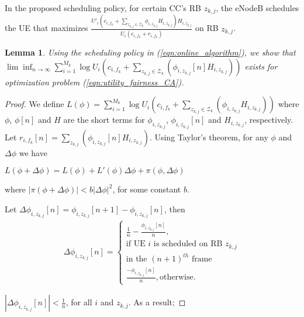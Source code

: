\documentclass[conference]{IEEEtran}
\newtheorem{lem}[thm]{Lemma}
\begin{document}
In the proposed scheduling policy, for certain CC's RB $z_{k,j}$, the eNodeB schedules the UE that maximizes $\frac{U'_i(c_{i,f_k}+\sum_{z_{k,j}\in \mathcal{Z}_k}\phi_{i,z_{k,j}}H_{i,z_{k,j}})H_{i,z_{k,j}}}{U_i(c_{i,f_k}+r_{i,f_k})}$ on RB $z_{k,j}$.

\begin{lem}\label{lem:optimality}  Using the scheduling policy in (\ref{eqn:online_algorithm}), we show that $\lim \inf_{n \rightarrow \infty} \sum_{i=1}^{M_k} \log U_i(c_{i,f_k}+\sum_{z_{k,j}\in \mathcal{Z}_k}(\phi_{i,z_{k,j}}[n] H_{i,z_{k,j}}))$ exists for optimization problem (\ref{eqn:utility_fairness_CA}).
\end{lem}

\begin{proof}
We define $L(\phi)=\sum_{i=1}^{M_k}\log U_i(c_{i,f_k}+\sum_{z_{k,j}\in \mathcal{Z}_k}(\phi_{i,z_{k,j}} H_{i,z_{k,j}}))$ where $\phi$, $\phi[n]$ and $H$ are the short terms for $\phi_{i,z_{k,j}}$, $\phi_{i,z_{k,j}}[n]$ and $H_{i,z_{k,j}}$, respectively. Let $r_{i,f_k}[n]=\sum_{z_{k,j}}(\phi_{i,z_{k,j}}[n] H_{i,z_{k,j}})$. Using Taylor's theorem, for any $\phi$ and $\Delta\phi$ we have

$L(\phi+\Delta\phi)=L(\phi)+L'(\phi)\Delta\phi+\pi(\phi,\Delta\phi)$

where $|\pi(\phi+\Delta\phi)|<b |\Delta\phi|^2$, for some constant $b$.

Let $\Delta\phi_{i,z_{k,j}}[n]=\phi_{i,z_{k,j}}[n+1]-\phi_{i,z_{k,j}}[n]$, then
\begin{equation*}\label{eqn:delta_phi_eqn}
\begin{aligned}
\Delta\phi_{i,z_{k,j}}[n]=
\begin{cases}
	\frac{1}{n}-\frac{\phi_{i,z_{k,j}}[n]}{n},\\
	\text{if UE $i$ is scheduled on RB $z_{k,j}$}\\
	\text{in the $(n+1)^{th}$ frame}\\
	\frac{-\phi_{i,z_{k,j}}[n]}{n},\text{otherwise}.
\end{cases}
\end{aligned}
\end{equation*}

$|\Delta\phi_{i,z_{k,j}}[n]|<\frac{1}{n}$, for all $i$ and $z_{k,j}$. As a result;


\end{proof}
\end{document}
